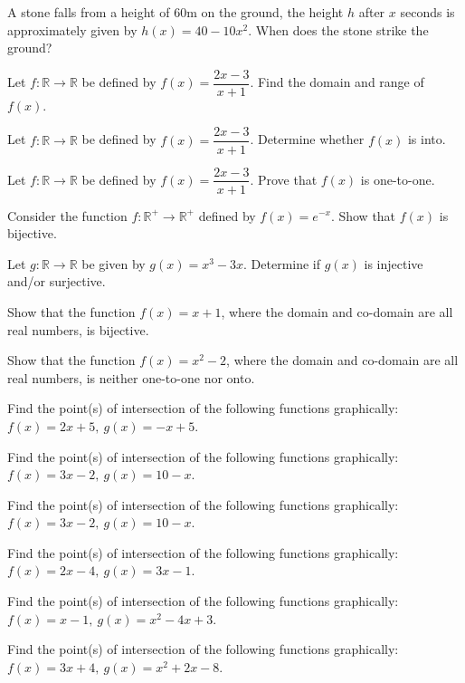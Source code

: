 \documentclass[11pt,a4paper]{article}
\begin{document}
\begin{longlist}
\item A stone falls from a height of $60$m on the ground, the height $h$ after $x$ seconds is approximately given by $h(x)=40-10x^2$. When does the stone strike the ground?

\item Let $f:\mathbb{R}\to\mathbb{R}$ be defined by $f(x)=\dfrac{2x-3}{x+1}$. Find the domain and range of $f(x)$.

\item Let $f:\mathbb{R}\to\mathbb{R}$ be defined by $f(x)=\dfrac{2x-3}{x+1}$. Determine whether $f(x)$ is into.

\item Let $f:\mathbb{R}\to\mathbb{R}$ be defined by $f(x)=\dfrac{2x-3}{x+1}$. Prove that $f(x)$ is one-to-one.

\item Consider the function $f:\mathbb{R}^+\to\mathbb{R}^+$ defined by $f(x)=e^{-x}$. Show that $f(x)$ is bijective.

\item Let $g:\mathbb{R}\to\mathbb{R}$ be given by $g(x)=x^3-3x$. Determine if $g(x)$ is injective and/or surjective.

\item Show that the function $f(x)=x+1$, where the domain and co-domain are all real numbers, is bijective.

\item Show that the function $f(x)=x^2-2$, where the domain and co-domain are all real numbers, is neither one-to-one nor onto.

\item Find the point(s) of intersection of the following functions graphically: $f(x)=2x+5,\ g(x)=-x+5$.

\item Find the point(s) of intersection of the following functions graphically: $f(x)=3x-2,\ g(x)=10-x$.

\item Find the point(s) of intersection of the following functions graphically: $f(x)=3x-2,\ g(x)=10-x$.

\item Find the point(s) of intersection of the following functions graphically: $f(x)=2x-4,\ g(x)=3x-1$.

\item Find the point(s) of intersection of the following functions graphically: $f(x)=x-1,\ g(x)=x^2-4x+3$.

\item Find the point(s) of intersection of the following functions graphically: $f(x)=3x+4,\ g(x)=x^2+2x-8$.


\end{longlist}
\end{document}
